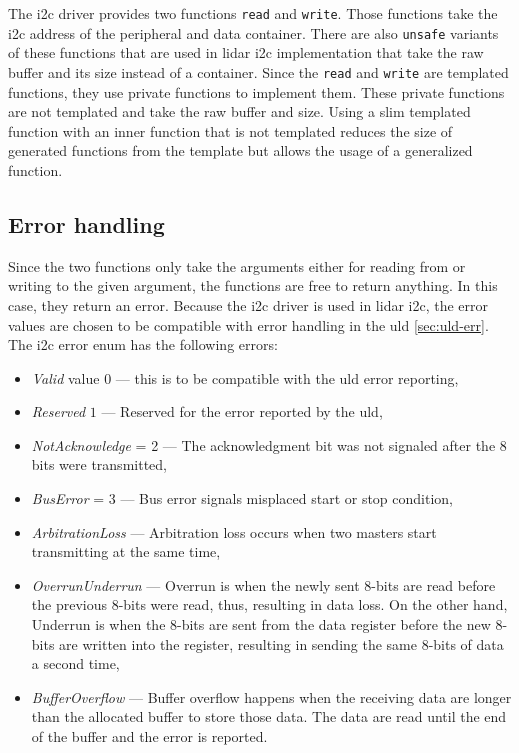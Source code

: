 \documentclass[
  digital,     %
  oneside,     %
  nosansbold,  %
  nocolorbold, %
  nolof,         %
  nolot,         %
]{fithesis4}
\begin{document}
{{{The \acrshort{i2c} driver provides two functions \lstinline|read| and \lstinline|write|. Those functions take the \acrshort{i2c} address of the peripheral and data container. There are also \lstinline|unsafe| variants of these functions that are used in \acrshort{lidar} \acrshort{i2c} implementation %
that take the raw buffer and its size instead of a container. Since the \lstinline|read| and \lstinline|write| are templated functions, they use private functions to implement them. These private functions are not templated and take the raw buffer and size. Using a slim templated function with an inner function that is not templated reduces the size of generated functions from the template but allows the usage of a generalized function.

\subsection{ Error handling }

Since the two functions only take the arguments either for reading from or writing to the given argument, the functions are free to return anything. In this case, they return an error. Because the \acrshort{i2c} driver is used in \acrshort{lidar} \acrshort{i2c}, the error values are chosen to be compatible with error handling in the \acrshort{uld} \autoref{sec:uld-err}. The \acrshort{i2c} error enum has the following errors:
\begin{itemize}
    \item \emph{Valid} value $0$ --- this is to be compatible with the \acrshort{uld} error reporting,
    \item \emph{Reserved} $1$ --- Reserved for the error reported by the \acrshort{uld},
    \item \emph{NotAcknowledge} = 2 --- The acknowledgment bit was not signaled after the 8 bits were transmitted,
    \item \emph{BusError} = 3 --- Bus error signals misplaced start or stop condition,
    \item \emph{ArbitrationLoss} --- Arbitration loss occurs when two masters start transmitting at the same time,
    \item \emph{OverrunUnderrun} --- Overrun is when the newly sent 8-bits are read before the previous 8-bits were read, thus, resulting in data loss. On the other hand, Underrun is when the 8-bits are sent from the data register before the new 8-bits are written into the register, resulting in sending the same 8-bits of data a second time,
    \item \emph{BufferOverflow} --- Buffer overflow happens when the receiving data are longer than the allocated buffer to store those data. The data are read until the end of the buffer and the error is reported.
\end{itemize}

}}}
\end{document}
